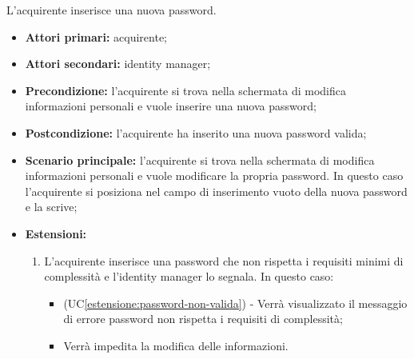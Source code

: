 \label{modifica-informazioni-acquirente.password.nuova-password}

L'acquirente inserisce una nuova password.
\begin{itemize}
    \item \textbf{Attori primari:} acquirente;
    \item \textbf{Attori secondari:} identity manager;
    \item \textbf{Precondizione:} l'acquirente si trova nella schermata di modifica informazioni personali e vuole inserire una nuova password;
    \item \textbf{Postcondizione:} l'acquirente ha inserito una nuova password valida;
    \item \textbf{Scenario principale:} l'acquirente si trova nella schermata di modifica informazioni personali e vuole modificare la propria password. In questo caso l'acquirente si posiziona nel campo di inserimento vuoto della nuova password e la scrive;
    \item \textbf{Estensioni:}
    \begin{enumerate}[label=\lett]
        \item L'acquirente inserisce una password che non rispetta i requisiti minimi di complessità e l'identity manager lo segnala. In questo caso:
        \begin{itemize}
            \item (UC\ref{estensione:password-non-valida}) - Verrà visualizzato il messaggio di errore password non rispetta i requisiti di complessità;
            \item Verrà impedita la modifica delle informazioni.
        \end{itemize}
    \end{enumerate}
\end{itemize}

\label{modifica-informazioni-acquirente.password.conferma-nuova-password}

